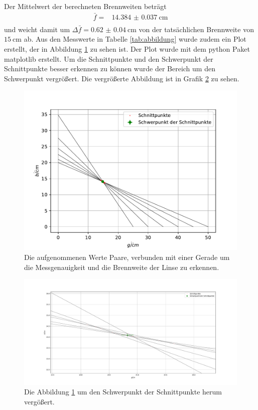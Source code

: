 Der Mittelwert der berechneten Brennweiten beträgt 
\begin{align*}
 \bar{f} = & \SI{14.384(37)}{\centi\meter}\\
\end{align*}
und weicht damit um $\Delta \bar{f} = \SI{0.62(4)}{\centi\meter}$ von der tatsächlichen Brennweite von $\SI{15}{\centi\meter}$ ab.
Aus den Messwerte in Tabelle \ref{tab:abbildung} wurde zudem ein Plot erstellt, der in Abbildung \ref{fig:brennweite} zu sehen ist.
Der Plot wurde mit dem python Paket matplotlib \cite{matplotlib} erstellt.
Um die Schnittpunkte und den Schwerpunkt der Schnittpunkte besser erkennen zu können wurde der Bereich um den Schwerpunkt vergrößert.
Die vergrößerte Abbildung ist in Grafik \ref{fig:zoom} zu sehen.
\begin{figure} 
    \centering
    \includegraphics[width=\textwidth]{content/data/brennweite.pdf}
    \caption{Die aufgenommenen Werte Paare, verbunden mit einer Gerade um die Messgenauigkeit und die Brennweite der Linse zu erkennen.}
    \label{fig:brennweite}
\end{figure}
\begin{figure}
    \centering
    \includegraphics[width=\textwidth]{content/data/zoom_schnittpunkt.pdf}
    \caption{Die Abbildung \ref{fig:brennweite} um den Schwerpunkt der Schnittpunkte herum vergößert.}
    \label{fig:zoom}
\end{figure}
